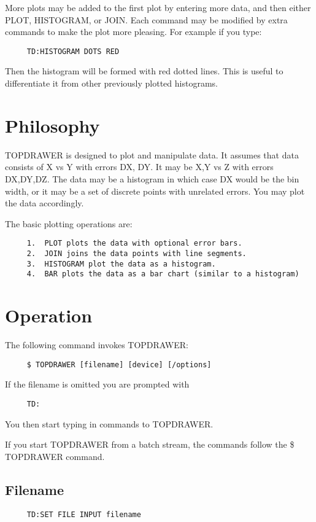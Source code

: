 More plots may be added to the first plot by entering more data, and then
either PLOT, HISTOGRAM, or JOIN.  Each command may be modified by extra
commands to make the plot more pleasing.  For example if you type:  
\begin{verbatim}
     TD:HISTOGRAM DOTS RED 
\end{verbatim}
Then the histogram will be formed with red dotted lines.  This is useful to
differentiate it from other previously plotted histograms.  
\section{Philosophy}
TOPDRAWER is designed to plot and manipulate data.  It assumes that data
consists of X vs Y with errors DX, DY.  It may be X,Y vs Z with errors
DX,DY,DZ.  The data may be a histogram in which case DX would be the bin
width, or it may be a set of discrete points with unrelated errors.  You
may plot the data accordingly.  

The basic plotting operations are:  
\begin{verbatim}
     1.  PLOT plots the data with optional error bars.  
     2.  JOIN joins the data points with line segments.  
     3.  HISTOGRAM plot the data as a histogram.  
     4.  BAR plots the data as a bar chart (similar to a histogram) 
\end{verbatim}

\section{Operation}
The following command invokes TOPDRAWER:  
\begin{verbatim}
     $ TOPDRAWER [filename] [device] [/options] 
\end{verbatim}
If the filename is omitted you are prompted with 
\begin{verbatim}
     TD:  
\end{verbatim}

You then start typing in commands to TOPDRAWER.  

If you start TOPDRAWER from a batch stream, the commands follow the
\$ TOPDRAWER command.  
\subsection{Filename}
\begin{verbatim}
     TD:SET FILE INPUT filename 
\end{verbatim}

